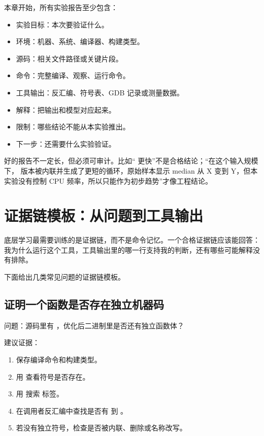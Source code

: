 本章开始，所有实验报告至少包含：

\begin{itemize}
  \item 实验目标：本次要验证什么。
  \item 环境：机器、系统、编译器、构建类型。
  \item 源码：相关文件路径或关键片段。
  \item 命令：完整编译、观察、运行命令。
  \item 工具输出：反汇编、符号表、GDB 记录或测量数据。
  \item 解释：把输出和模型对应起来。
  \item 限制：哪些结论不能从本实验推出。
  \item 下一步：还需要什么实验验证。
\end{itemize}

好的报告不一定长，但必须可审计。比如“ 更快”不是合格结论；“在这个输入规模下， 版本被内联并生成了更短的循环，原始样本显示 median 从 X 变到 Y，但本实验没有控制 CPU 频率，所以只能作为初步趋势”才像工程结论。

\section{证据链模板：从问题到工具输出}

底层学习最需要训练的是证据链，而不是命令记忆。一个合格证据链应该能回答：我为什么运行这个工具，工具输出里的哪一行支持我的判断，还有哪些可能解释没有排除。

下面给出几类常见问题的证据链模板。

\subsection{证明一个函数是否存在独立机器码}

问题：源码里有 ，优化后二进制里是否还有独立函数体？

建议证据：

\begin{enumerate}
  \item 保存编译命令和构建类型。
  \item 用  查看符号是否存在。
  \item 用  搜索  标签。
  \item 在调用者反汇编中查找是否有  到 。
  \item 若没有独立符号，检查是否被内联、删除或名称改写。
\end{enumerate}

